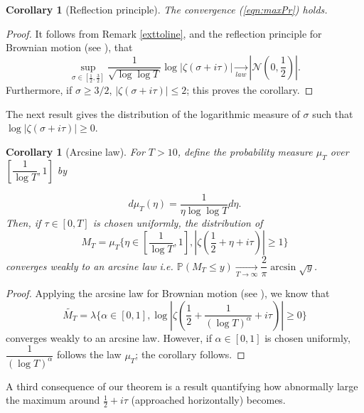 \documentclass{article}
\newcommand{\Proba}{\mathbb{P}}
\newcommand{\1}{\mathds{1}}
\numberwithin{equation}{section}
\renewcommand{\leq}{\leqslant}
\renewcommand{\geq}{\geqslant}
\theoremstyle{plain} %
\newtheorem{corollary}[theorem]{Corollary}
\newcommand{\hf}{\frac{1}{2}}
\begin{document}
\begin{corollary}[Reflection principle] \label{refl}
 The convergence (\ref{eqn:maxPr}) holds.
\end{corollary}

\begin{proof}
    It follows from Remark \ref{exttoline}, and the reflection principle for Brownian motion (see \cite[Proposition III.3.7]{revuzyor}), that
    \begin{equation}
        \sup_{\sigma \in [\tfrac{1}{2}, \tfrac{3}{2}]} \frac{1}{\sqrt{\log \log T}} \log |\zeta(\sigma + i \tau)| \underset{law}{\longrightarrow} |\mathscr{N}(0, \frac{1}{2})|.
    \end{equation}
    Furthermore, if $\sigma \geq 3/2$, $|\zeta(\sigma + i \tau)| \leq 2$; this proves the corollary.
\end{proof}

The next result gives the distribution of the logarithmic measure of $\sigma$ such that $\log|\zeta(\sigma+ i\tau)|\geq 0$. 
\begin{corollary}[Arcsine law]
    For $T > 10$, define the probability measure $\mu_T$ over $\left[\dfrac{1}{\log T}, 1\right]$ by

    \begin{equation}
        d \mu_T (\eta) = \dfrac{1}{\eta\log \log T}d \eta.
    \end{equation}
    Then, if $\tau \in [0, T]$ is chosen uniformly, the distribution of
$$M_T = \mu_T \{ \eta \in [\dfrac{1}{\log T}, 1], |\zeta(\hf + \eta + i \tau)| \geq 1 \}$$
converges weakly to an arcsine law i.e. $\Proba(M_T \leq y) \underset{T \to \infty}{\longrightarrow} \dfrac{2}{\pi} \arcsin{\sqrt{y}}$.
\end{corollary}

\begin{proof}
    Applying the arcsine law for Brownian motion (see \cite[Theorem VI.2.7]{revuzyor}), we know that 
    \begin{equation}
        \tilde{M_T} = \lambda \{ \alpha \in [0, 1], \log |\zeta(\hf + \frac{1}{(\log T)^\alpha} + i \tau)| \geq 0 \}
    \end{equation}
    converges weakly to an arcsine law. However, if $\alpha \in [0, 1]$ is chosen uniformly, $\dfrac{1}{(\log T)^\alpha}$ follows the law $\mu_T$; the corollary follows.
\end{proof}

A third consequence of our theorem is a result quantifying how abnormally large the maximum around $\tfrac{1}{2}+ i\tau$ (approached horizontally) becomes.
\end{document}
